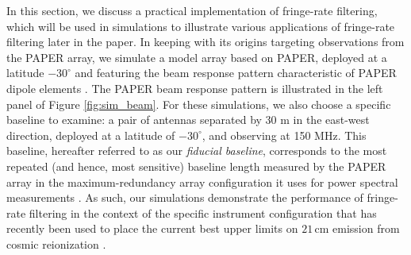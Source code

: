 \documentclass[twocolumn,apj,numberedappendix]{emulateapj}
\begin{document}
In this section, we discuss a practical implementation of fringe-rate filtering, which will be used in simulations to illustrate various applications of fringe-rate filtering later in the paper. In keeping with its origins targeting observations from the
PAPER array, we simulate a model array based on PAPER, deployed at a latitude $-30^\circ$
and featuring the beam response pattern characteristic of PAPER dipole elements \citep{parsons_et_al2008,pober_et_al2012}.
The PAPER beam response pattern is illustrated in the left panel of Figure \ref{fig:sim_beam}.
For these simulations, we also choose a specific baseline to examine: a pair of antennas separated by 30 m in the 
east-west direction, deployed at a latitude of $-30^\circ$, and observing at 150 MHz.  This baseline, hereafter referred to as our {\it fiducial baseline}, 
corresponds to the most repeated (and hence,
most sensitive) baseline length measured by the PAPER array in the maximum-redundancy array configuration it uses
for power spectral measurements \citep{parsons_et_al2012a,P14,ali_et_al2015}.  As such, our simulations demonstrate the performance of fringe-rate filtering in the context of the specific instrument configuration
that has recently been used to place the current best upper limits on $21\,\textrm{cm}$ emission from cosmic reionization \citep{P14,J14,ali_et_al2015}.
\end{document}
